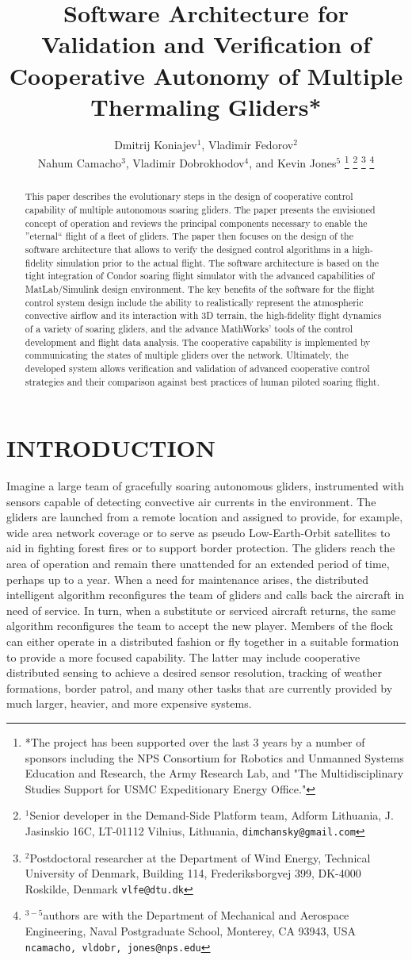 \documentclass[letterpaper, 10 pt, conference]{ieeeconf}  %
\title{\LARGE \bf
Software Architecture for Validation and Verification of Cooperative Autonomy of Multiple Thermaling Gliders* }
\author{Dmitrij Koniajev$^{1}$, Vladimir Fedorov$^{2}$ \\
    Nahum Camacho$^{3}$, Vladimir Dobrokhodov$^{4}$, and Kevin Jones$^{5}$%
\thanks{*The project has been supported over the last 3 years by a number of
sponsors including the NPS Consortium for Robotics and Unmanned Systems Education and Research, the Army Research Lab, and "The Multidisciplinary Studies Support for USMC Expeditionary Energy Office."}%
\thanks{$^{1}$Senior developer in the Demand-Side Platform team,
        Adform Lithuania, J. Jasinskio 16C, LT-01112 Vilnius, Lithuania,
        {\tt\small {dimchansky@gmail.com}}}%
\thanks{$^{2}$Postdoctoral researcher at the Department of Wind Energy,
        Technical University of Denmark, Building 114, Frederiksborgvej 399, DK-4000 Roskilde,
        Denmark
        {\tt\small {vlfe@dtu.dk}}}%
\thanks{$^{3-5}$authors are with the Department of Mechanical and Aerospace Engineering,
        Naval Postgraduate School, Monterey, CA 93943, USA
        {\tt\small {ncamacho, vldobr, jones}@nps.edu}}%
} %
\newcommand{\squeezeup}{\vspace{-1.0mm}}
\begin{document}
\maketitle \thispagestyle{empty} \pagestyle{empty}


\begin{abstract}
This paper describes the evolutionary steps in the design of cooperative control capability of multiple autonomous soaring gliders. The paper presents the envisioned concept of operation and reviews the principal components necessary to enable the ''eternal`` flight of a fleet of gliders. The paper then focuses on the design of the software architecture that allows to verify the designed control algorithms in a high-fidelity simulation prior to the actual flight. The software architecture is based on the tight integration of Condor soaring flight simulator with the advanced capabilities of MatLab/Simulink design environment. The key benefits of the software for the flight control system design include the ability to realistically represent the atmospheric convective airflow and its interaction with 3D terrain, the high-fidelity flight dynamics of a variety of soaring gliders, and the advance MathWorks' tools of the control development and flight data analysis. The cooperative capability is implemented by communicating the states of multiple gliders over the network. Ultimately, the developed system allows verification and validation of advanced cooperative control strategies and their comparison against best practices of human piloted soaring flight.
\end{abstract}


\section{INTRODUCTION}
\squeezeup
Imagine a large team of gracefully soaring autonomous gliders, instrumented with sensors capable of detecting convective air currents in the environment. The gliders are launched from a remote location and assigned to provide, for example, wide area network coverage or to serve as pseudo Low-Earth-Orbit satellites to aid in fighting forest fires or to support border protection. The gliders reach the area of operation and remain there unattended for an extended period of time, perhaps up to a year. When a need for maintenance arises, the distributed intelligent algorithm reconfigures the team of gliders and calls back the aircraft in need of service. In turn, when a substitute or serviced aircraft returns, the same algorithm reconfigures the team to accept the new player. Members of the flock can either operate in a distributed fashion or fly together in a suitable formation to provide a more focused capability. The latter may include cooperative distributed sensing to achieve a desired sensor resolution, tracking of weather formations, border patrol, and many other tasks that are currently provided by much larger, heavier, and more expensive systems.
\end{document}
